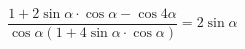 \begin{ex}[type=prove_identity]
	\begin{condition}
		\( \dfrac{1+2\sin\alpha\cdot\cos\alpha-\cos4\alpha}{\cos\alpha(1+4\sin\alpha\cdot\cos\alpha)}=2\sin\alpha \)
	\end{condition}
\end{ex}